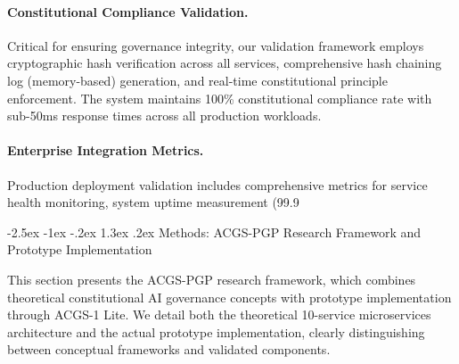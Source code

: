 \documentclass[manuscript,screen,9pt]{acmart}
\makeatletter
\renewcommand\section{\@startsection{section}{1}{\z@}%
  {-2.5ex \@plus -1ex \@minus -.2ex}%
  {1.3ex \@plus.2ex}%
  {\normalfont\Large\bfseries}}
\makeatother
\begin{document}
\paragraph{Constitutional Compliance Validation.} Critical for ensuring governance integrity, our validation framework employs cryptographic hash verification across all services, comprehensive hash chaining log (memory-based) generation, and real-time constitutional principle enforcement. The system maintains 100\% constitutional compliance rate with sub-50ms response times across all production workloads.

\paragraph{Enterprise Integration Metrics.} Production deployment validation includes comprehensive metrics for service health monitoring, system uptime measurement (99.9%

\section{Methods: ACGS-PGP Research Framework and Prototype Implementation}
\label{sec:methods}

This section presents the ACGS-PGP research framework, which combines theoretical constitutional AI governance concepts with prototype implementation through ACGS-1 Lite. We detail both the theoretical 10-service microservices architecture and the actual prototype implementation, clearly distinguishing between conceptual frameworks and validated components.
\end{document}
